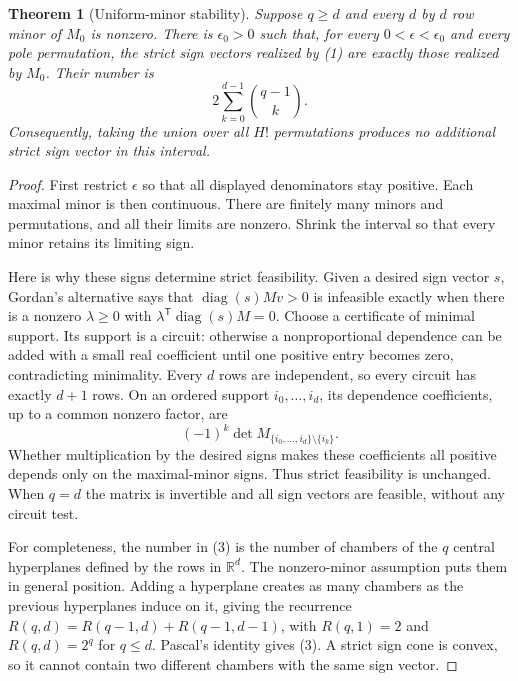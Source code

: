 \documentclass[11pt]{article}
\newtheorem{theorem}{Theorem}
\begin{document}
\begin{theorem}[Uniform-minor stability]
Suppose $q\geq d$ and every $d$ by $d$ row minor of $M_0$ is nonzero.
There is $\epsilon_0>0$ such that, for every
$0<\epsilon<\epsilon_0$ and every pole permutation, the strict sign
vectors realized by (1) are exactly those realized by $M_0$.
Their number is
\[
 2\sum_{k=0}^{d-1}\binom{q-1}{k}.                 \tag{3}
\]
Consequently, taking the union over all $H!$ permutations produces no
additional strict sign vector in this interval.
\end{theorem}
\begin{proof}
First restrict $\epsilon$ so that all displayed denominators stay
positive. Each maximal minor is then continuous. There are finitely
many minors and permutations, and all their limits are nonzero.
Shrink the interval so that every minor retains its limiting sign.

Here is why these signs determine strict feasibility. Given a desired
sign vector $s$, Gordan's alternative says that
$\operatorname{diag}(s)Mv>0$ is infeasible exactly when there is a
nonzero $\lambda\geq0$ with
$\lambda^{\mathsf T}\operatorname{diag}(s)M=0$.
Choose a certificate of minimal support. Its support is a circuit:
otherwise a nonproportional dependence can be added with a small real
coefficient until one positive entry becomes zero, contradicting
minimality. Every $d$ rows are independent, so every circuit has
exactly $d+1$ rows. On an ordered support $i_0,\ldots,i_d$, its
dependence coefficients, up to a common nonzero factor, are
\[
 (-1)^k\det M_{\{i_0,\ldots,i_d\}\setminus\{i_k\}}.
\]
Whether multiplication by the desired signs makes these coefficients
all positive depends only on the maximal-minor signs. Thus strict
feasibility is unchanged. When $q=d$ the matrix is invertible and all
sign vectors are feasible, without any circuit test.

For completeness, the number in (3) is the number of chambers of the
$q$ central hyperplanes defined by the rows in $\mathbb R^d$.
The nonzero-minor assumption puts them in general position. Adding a
hyperplane creates as many chambers as the previous hyperplanes induce
on it, giving the recurrence
$R(q,d)=R(q-1,d)+R(q-1,d-1)$, with
$R(q,1)=2$ and $R(q,d)=2^q$ for $q\leq d$.
Pascal's identity gives (3). A strict sign cone is convex, so it cannot
contain two different chambers with the same sign vector.
\end{proof}
\end{document}
